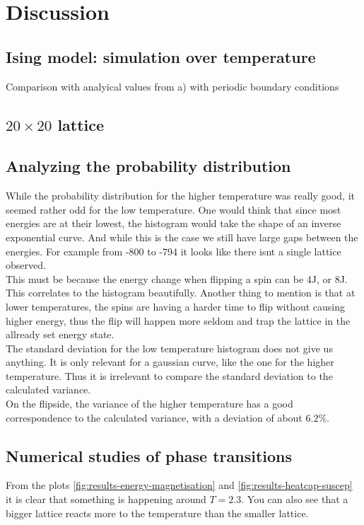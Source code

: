 \documentclass[../main.tex]{subfiles}
\begin{document}
\section{Discussion}

\subsection{Ising model: simulation over temperature}
Comparison with analyical values from a) with periodic boundary conditions




\subsection{$20 \times 20$ lattice}




\subsection{Analyzing the probability distribution}
While the probability distribution for the higher temperature was really good, it seemed rather odd for the low temperature. One would think that since most energies are at their lowest, the histogram would take the shape of an inverse exponential curve. And while this is the case we still have large gaps between the energies. For example from -800 to -794 it looks like there isnt a single lattice observed. \\
This must be because the energy change when flipping a spin can be 4J, or 8J. This correlates to the histogram beautifully. Another thing to mention is that at lower temperatures, the spins are having a harder time to flip without causing higher energy, thus the flip will happen more seldom and trap the lattice in the allready set energy state.\\
The standard deviation for the low temperature histogram does not give us anything. It is only relevant for a gaussian curve, like the one for the higher temperature. Thus it is irrelevant to compare the standard deviation to the calculated variance.\\
On the flipside, the variance of the higher temperature has a good correspondence to the calculated variance, with a deviation of about $6.2\%$.


\subsection{Numerical studies of phase transitions}
From the plots \ref{fig:results-energy-magnetisation} and \ref{fig:results-heatcap-suscep} it is clear that something is happening around $T = 2.3$. You can also see that a bigger lattice reacts more to the temperature than the smaller lattice.\\
\end{document}
